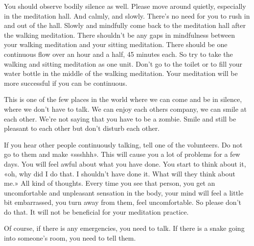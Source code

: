 \documentclass[letterpaper,10pt,english]{sphinxmanual}
\begin{document}
\sphinxAtStartPar
You should observe bodily silence as well. Please move around quietly,
especially in the meditation hall. And calmly, and slowly. There’s no need
for you to rush in and out of the hall. Slowly and mindfully come back to the
meditation hall after the walking meditation. There shouldn’t be any gaps in
mindfulness between your walking meditation and your sitting meditation.
There should be one continuous flow over an hour and a half, 45 minutes
each. So try to take the walking and sitting meditation as one unit. Don’t go
to the toilet or to fill your water bottle in the middle of the walking meditation. Your meditation will be more successful if you can be continuous.

\sphinxAtStartPar
This is one of the few places in the world where we can come and be in
silence, where we don’t have to talk. We can enjoy each others company, we
can smile at each other. We’re not saying that you have to be a zombie. Smile
and still be pleasant to each other but don’t disturb each other.

\sphinxAtStartPar
If  you  hear  other  people  continuously  talking,  tell  one  of  the  volunteers. Do not go to them and make «ssshhh». This will cause you a lot of
problems  for  a  few  days. You  will  feel  awful  about  what  you  have  done.
You start to think about it, «oh, why did I do that. I shouldn’t have done it.
What will they think about me.» All kind of thoughts. Every time you see
that person, you get an uncomfortable and unpleasant sensation in the body,
your mind will feel a little bit embarrassed, you turn away from them, feel
uncomfortable.  So  please  don’t  do  that.  It  will  not  be  beneficial  for  your
meditation practice.

\sphinxAtStartPar
Of course, if there is any emergencies, you need to talk. If there is a
snake going into someone’s room, you need to tell them.
\end{document}

